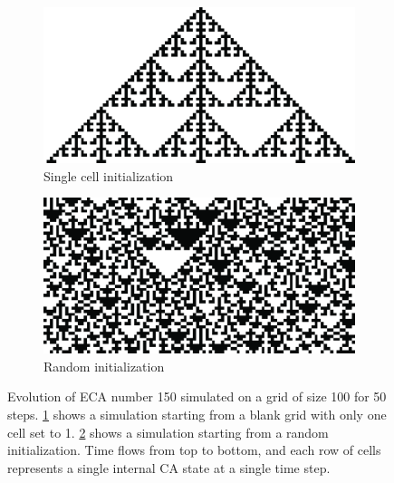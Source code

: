 \begin{figure}[htbp]
\begin{subfigure}[t]{.04\linewidth}
  \caption*{}
\end{subfigure}
\begin{subfigure}[t]{.45\linewidth}
  \centering
  \includegraphics[width=\linewidth]{figures/eca_150_single.pdf}
  \caption{Single cell initialization}
  \label{fig:eca_150_single}
\end{subfigure}
\begin{subfigure}[t]{.45\linewidth}
  \centering
  \includegraphics[width=\linewidth]{figures/eca_150_random.pdf}
  \caption{Random initialization}
  \label{fig:eca_150_random}
\end{subfigure}
\caption{Evolution of \ac{ECA} number 150 simulated on a grid of size 100 for 50
  steps. \ref{fig:eca_150_single} shows a simulation starting from a blank grid
  with only one cell set to 1. \ref{fig:eca_150_random} shows a simulation
  starting from a random initialization. Time flows from top to bottom, and each row of cells represents a single internal CA state at a single time step.}
  \label{fig:eca_150}
\end{figure}


